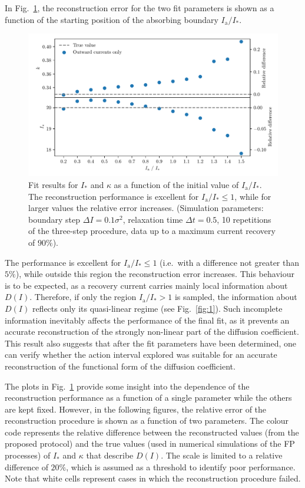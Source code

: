 {In Fig.~\ref{fig:different_position}, the reconstruction error for the two fit parameters is shown as a function of the starting position of the absorbing boundary $I_\mathrm{a}/I_\ast$. 
%
\begin{figure}[htp]
    \centering
    \includegraphics[width=\textwidth]{4_probing_the_diffusive_behavior/figs/final/different_position.pdf}
    \caption{Fit results for $I_\ast$ and $\kappa$ as a function of the initial value of $I_\mathrm{a}/I_\ast$. The reconstruction performance is excellent for $I_\mathrm{a}/I_\ast \leq 1$, while for larger values the relative error increases. (Simulation parameters: boundary step $\Delta I=0.1 \sigma^2$, relaxation time $\Delta t=0.5$, 10 repetitions of the three-step procedure, data up to a maximum current recovery of $90\%$).}
    \label{fig:different_position}
\end{figure}
%
The performance is excellent for $I_\mathrm{a}/I_\ast \leq 1$ {(i.e.\ with a difference not greater than $5\%$)}, while outside this region the reconstruction error increases. This behaviour is to be expected, as a recovery current carries mainly local information about $D(I)$. Therefore, if only the region $I_\mathrm{a}/I_\ast > 1$ is sampled, the information about $D(I)$ reflects only its quasi-linear regime (see Fig.~\ref{fig:1}). Such incomplete information inevitably affects the performance of the final fit, as it prevents an accurate reconstruction of the strongly non-linear part of the diffusion coefficient. This result also suggests that after the fit parameters have been determined, one can verify whether the action interval explored was suitable for an accurate reconstruction of the functional form of the diffusion coefficient.

The plots in Fig.~\ref{fig:different_position} provide some insight into the dependence of the reconstruction performance as a function of a single parameter while the others are kept fixed. However, in the following figures, the relative error of the reconstruction procedure is shown as a function of two parameters. The colour code represents the relative difference between the reconstructed values (from the proposed protocol) and the true values (used in numerical simulations of the FP processes) of $I_\ast$ and $\kappa$ that describe $D(I)$. The scale is limited to a relative difference of $20\%$, which is assumed as a threshold to identify poor performance. Note that white cells represent cases in which the reconstruction procedure failed.

}
